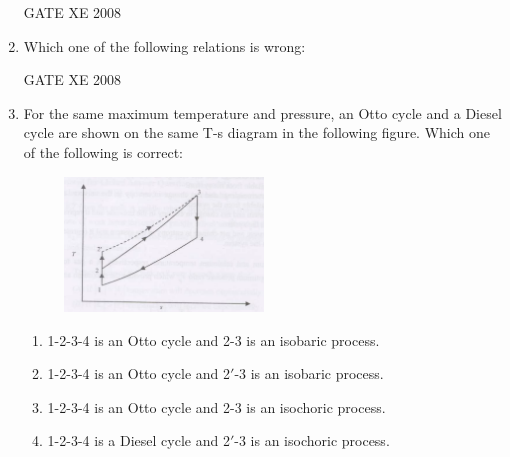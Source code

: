 \documentclass[12pt]{article}
\begin{document}
\begin{enumerate}
GATE XE 2008

\item Which one of the following relations is wrong:  

\begin{enumerate}
\end{enumerate}

GATE XE 2008

\item  For the same maximum temperature and pressure, an Otto cycle and a Diesel cycle are shown on the same T-s diagram in the following figure. Which one of the following is correct:  

    \begin{figure}[H]
    \centering
    \includegraphics[width=0.5\textwidth]{figs/ass1_g_q19.png}
    \caption{}
    \end{figure}
\begin{enumerate}
\item  1-2-3-4 is an Otto cycle and 2-3 is an isobaric process. 
\item  1-2-3-4 is an Otto cycle and 2$'$-3 is an isobaric process. 
\item  1-2-3-4 is an Otto cycle and 2-3 is an isochoric process. 
\item  1-2-3-4 is a Diesel cycle and 2$'$-3 is an isochoric process.
\end{enumerate}


\end{enumerate}
\end{document}
